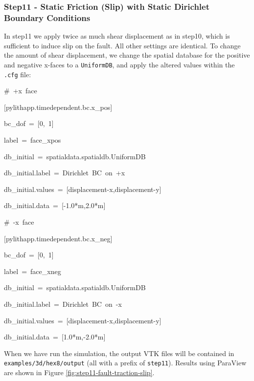 \subsubsection{Step11 - Static Friction (Slip) with Static Dirichlet Boundary Conditions}

In step11 we apply twice as much shear displacement as in step10,
which is sufficient to induce slip on the fault. All other settings
are identical. To change the amount of shear displacement, we change
the spatial database for the positive and negative x-faces to a \texttt{UniformDB},
and apply the altered values within the \texttt{.cfg} file:
\begin{lyxcode}
\#~+x~face

{[}pylithapp.timedependent.bc.x\_pos{]}

bc\_dof~=~{[}0,~1{]}

label~=~face\_xpos

db\_initial~=~spatialdata.spatialdb.UniformDB

db\_initial.label~=~Dirichlet~BC~on~+x

db\_initial.values~=~{[}displacement-x,displacement-y{]}

db\_initial.data~=~{[}-1.0{*}m,2.0{*}m{]}



\#~-x~face

{[}pylithapp.timedependent.bc.x\_neg{]}

bc\_dof~=~{[}0,~1{]}

label~=~face\_xneg

db\_initial~=~spatialdata.spatialdb.UniformDB

db\_initial.label~=~Dirichlet~BC~on~-x

db\_initial.values~=~{[}displacement-x,displacement-y{]}

db\_initial.data~=~{[}1.0{*}m,-2.0{*}m{]}
\end{lyxcode}
When we have run the simulation, the output VTK files will be contained
in \texttt{examples/3d/hex8/output} (all with a prefix of \texttt{step11}).
Results using ParaView are shown in Figure \ref{fig:step11-fault-traction-slip}.

